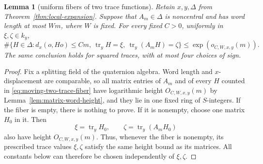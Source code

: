 \documentclass[11pt,reqno]{amsart}
\newtheorem{lemma}[theorem]{Lemma}
\theoremstyle{definition}
\theoremstyle{remark}
\newcommand{\Tr}{\operatorname{tr}}
\begin{document}
\begin{lemma}[uniform fibers of two trace functions]
\label{lem:moving-two-trace-fibers}
Retain \(x,y,\Delta\) from Theorem~\ref{thm:local-expansion}.  Suppose that
\(A_m\in\Delta\) is noncentral and has word length at most \(Wm\), where
\(W\) is fixed.  For every fixed \(C>0\), uniformly in
\(\xi,\zeta\in k_y\),
\begin{equation}\label{eq:moving-two-trace-fiber}
 \#\{H\in\Delta:d_x(o,Ho)\le Cm,
       \ \Tr_yH=\xi,\ \Tr_y(A_mH)=\zeta\}
 \le\exp(o_{C,W,x,y}(m)).
\end{equation}
The same conclusion holds for squared traces, with at most four choices of
sign.
\end{lemma}

\begin{proof}
Fix a splitting field of the quaternion algebra.  Word length
and \(x\)-displacement are comparable, so all matrix entries of \(A_m\) and
of every \(H\) counted in \eqref{eq:moving-two-trace-fiber} have logarithmic
height \(O_{C,W,x,y}(m)\) by Lemma~\ref{lem:matrix-word-height}, and they
lie in one fixed ring of \(S\)-integers.
If the fiber is empty, there is nothing to prove.  If it is nonempty, choose
one matrix \(H_0\) in it.  Then
\[
 \xi=\Tr_yH_0,
 \qquad \zeta=\Tr_y(A_mH_0)
\]
also have height \(O_{C,W,x,y}(m)\).  Thus, whenever the fiber is nonempty,
its prescribed trace values \(\xi,\zeta\) satisfy the same height bound as
its matrices.  All constants below can therefore be chosen independently
of \(\xi,\zeta\).


\end{proof}
\end{document}
